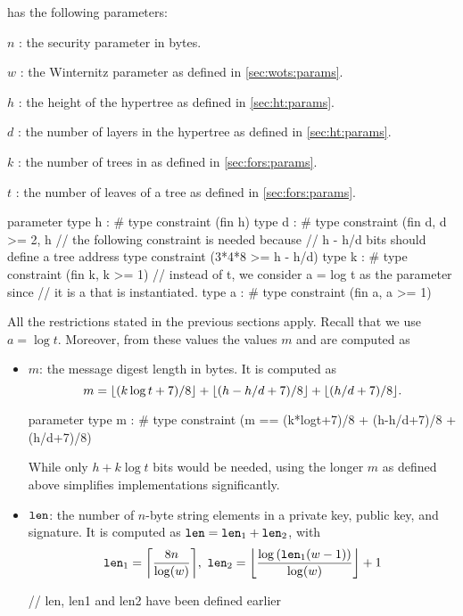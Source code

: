 \spx has the following parameters:
\begin{description}
 \item  $n$ : the security parameter in bytes.
 \item  $w$ : the Winternitz parameter as defined in \autoref{sec:wots:params}.
 \item  $h$ : the height of the hypertree as defined in \autoref{sec:ht:params}.
 \item  $d$ : the number of layers in the hypertree as defined in \autoref{sec:ht:params}.
 \item  $k$ : the number of trees in \fors as defined in \autoref{sec:fors:params}.
 \item  $t$ : the number of leaves of a \fors tree as defined in \autoref{sec:fors:params}.
\end{description}

\begin{code}
  parameter
    type h : #
    type constraint (fin h)
    type d : #
    type constraint (fin d, d >= 2, h%
    // the following constraint is needed because
    // h - h/d bits should define a tree address
    type constraint (3*4*8 >= h - h/d)
    type k : #
    type constraint (fin k, k >= 1)
    // instead of t, we consider a = log t as the parameter since
    // it is a that is instantiated.
    type a : #
    type constraint (fin a, a >= 1)
\end{code}

All the restrictions stated in the previous sections apply. Recall that
we use $a = \log t$. Moreover, from these values the values $m$ and \len are
computed as
\begin{itemize}
  \item $m$: the message digest length in bytes.
  It is computed as
  $$m=\lfloor(k\log t +7)/ 8\rfloor + \lfloor(h - h/d +7)/ 8\rfloor + \lfloor(h / d +7)/ 8\rfloor.$$

\begin{code}
  parameter
    type m : #
    type constraint (m == (k*logt+7)/8 + (h-h/d+7)/8 + (h/d+7)/8)
\end{code}

  While only $h + k\log t$ bits would be needed, using the longer $m$ as defined
  above simplifies implementations significantly.
  \item $\texttt{len}$: the number of $n$-byte string elements in a \wotsp private
        key, public key, and signature. It is computed as $\texttt{len} =
        \texttt{len}_1 + \texttt{len}_2$, with
        \begin{equation*}
          \len_1 = \ceil*{\frac{8n}{\log(w)}},\
          \len_2 = \floor*{\frac{\log{(\len_1(w - 1))}}{\log(w)}} + 1
        \end{equation*}

\begin{code}
  // len, len1 and len2 have been defined earlier
\end{code}
\end{itemize}

